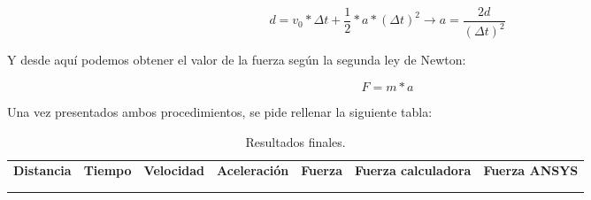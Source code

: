 \[d = v_0 * \Delta t + \frac{1}{2}*a*(\Delta t)^2 \rightarrow a = \frac{2d}{(\Delta t)^2}\]

Y desde aquí podemos obtener el valor de la fuerza según la segunda ley de Newton:

\[F=m*a\]

Una vez presentados ambos procedimientos, se pide rellenar la siguiente tabla:

\begin{table}[H]
    \centering
    \begin{adjustbox}{max width=\textwidth,center}
        \begin{tabular}{|c|c|c|c|c|c|c|}
        \hline
        \textbf{Distancia} & \textbf{Tiempo} & \textbf{Velocidad} & \textbf{Aceleración} & \textbf{Fuerza} & \textbf{Fuerza calculadora} & \textbf{Fuerza ANSYS} \\
          &  &  &  &  &  &  \\
          &  &  &  &  &  &  \\
        \hline
        \end{tabular}
    \end{adjustbox}
    \caption{Resultados finales.}
    \label{tab:resultadosFinales}
\end{table}